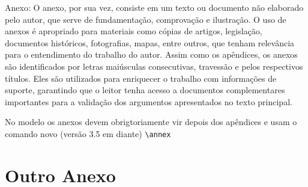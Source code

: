 \documentclass[dsc,pdfa]{coppe}
\begin{document}
Anexo: O anexo, por sua vez, consiste em um texto ou documento não elaborado pelo autor, que serve de fundamentação, comprovação e ilustração. O uso de anexos é apropriado para materiais como cópias de artigos, legislação, documentos históricos, fotografias, mapas, entre outros, que tenham relevância para o entendimento do trabalho do autor. Assim como os apêndices, os anexos são identificados por letras maiúsculas consecutivas, travessão e pelos respectivos títulos. Eles são utilizados para enriquecer o trabalho com informações de suporte, garantindo que o leitor tenha acesso a documentos complementares importantes para a validação dos argumentos apresentados no texto principal.

No modelo \CoppeTeX os anexos devem obrigtoriamente vir depois dos apêndices e usam o comando novo (versão 3.5 em diante) \verb|\annex|

\chapter{Outro Anexo}

\coppetexfinalpage%
\end{document}
